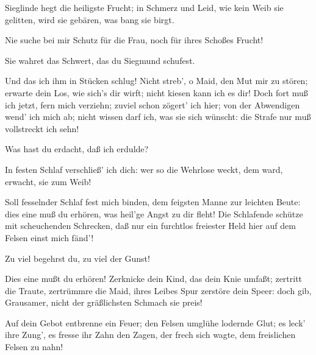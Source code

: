 \begin{drama}

Sieglinde hegt die heiligste Frucht;
in Schmerz und Leid, wie kein Weib sie gelitten,
wird sie gebären,
was bang sie birgt.
 

\Wotanspeaks
Nie suche bei mir Schutz für die Frau,
noch für ihres Schoßes Frucht!
 

\Brunnhildespeaks


Sie wahret das Schwert, das du Siegmund schufest.
 

\Wotanspeaks


Und das ich ihm in Stücken schlug!
Nicht streb', o Maid, den Mut mir zu stören;
erwarte dein Los, wie sich's dir wirft;
nicht kiesen kann ich es dir!
Doch fort muß ich jetzt, fern mich verziehn;
zuviel schon zögert' ich hier;
von der Abwendigen wend' ich mich ab;
nicht wissen darf ich, was sie sich wünscht:
die Strafe nur muß vollstreckt ich sehn!
 

\Brunnhildespeaks
Was hast du erdacht, daß ich erdulde?
 

\Wotanspeaks
In festen Schlaf verschließ' ich dich:
wer so die Wehrlose weckt,
dem ward, erwacht, sie zum Weib!
 

\Brunnhildespeaks


Soll fesselnder Schlaf fest mich binden,
dem feigsten Manne zur leichten Beute:
dies eine muß du erhören,
was heil'ge Angst zu dir fleht!
Die Schlafende schütze mit scheuchenden Schrecken,
daß nur ein furchtlos freiester Held
hier auf dem Felsen einst mich fänd'!
 

\Wotanspeaks
Zu viel begehrst du, zu viel der Gunst!
 

\Brunnhildespeaks


Dies eine mußt du erhören!
Zerknicke dein Kind, das dein Knie umfaßt;
zertritt die Traute, zertrümmre die Maid,
ihres Leibes Spur zerstöre dein Speer:
doch gib, Grausamer, nicht
der gräßlichsten Schmach sie preis!
 



Auf dein Gebot entbrenne ein Feuer;
den Felsen umglühe lodernde Glut;
es leck' ihre Zung', es fresse ihr Zahn
den Zagen, der frech sich wagte,
dem freislichen Felsen zu nahn!
 

\Wotanspeaks


\end{drama}
